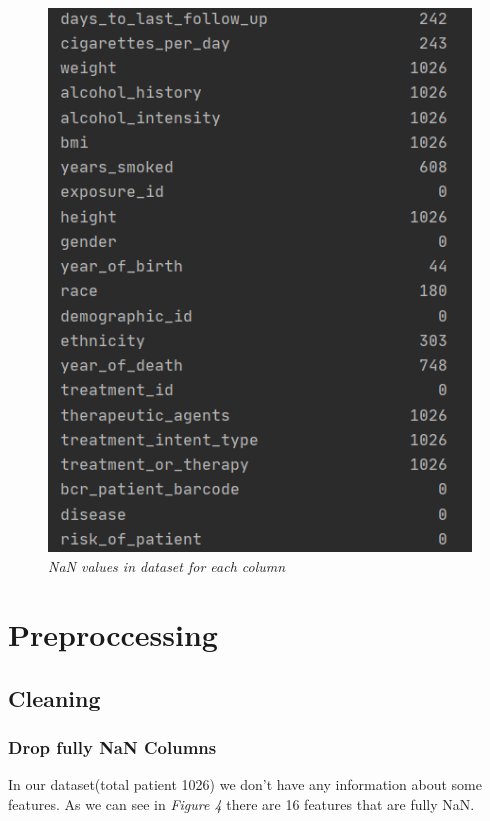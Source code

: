 \documentclass[onecolumn]{article}
\begin{document}
\begin{figure}[h]
\begin{minipage}{0.4\textwidth}
        \includegraphics[width=1.0\textwidth]{nan2} %
    \end{minipage}
    \bigbreak
    \caption{\emph{NaN values in dataset for each column}}
\end{figure}
\section{Preproccessing}
\subsection{Cleaning}

\subsubsection{Drop fully NaN Columns}
In our dataset(total patient 1026) we don't have any information about some features. As we can see in \emph{Figure 4} there are 16 features that are fully NaN.
\end{document}
